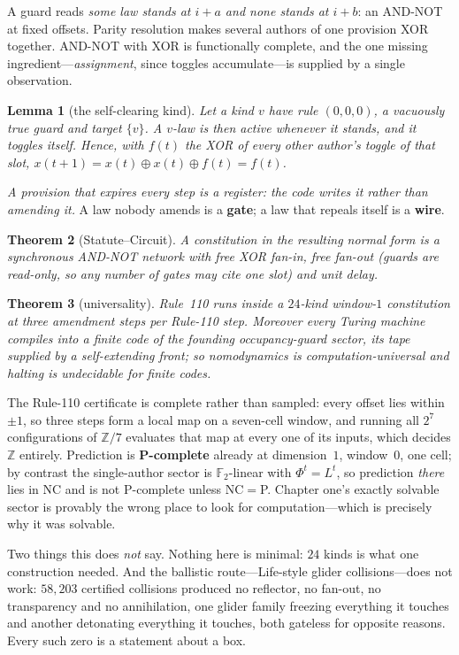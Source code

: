 \documentclass[10pt]{article}
\newtheorem{theorem}{Theorem}
\newtheorem{lemma}[theorem]{Lemma}
\theoremstyle{definition}
\theoremstyle{remark}
\begin{document}
A guard reads \emph{some law stands at $i+a$ and none stands at $i+b$}: an
AND-NOT at fixed offsets. Parity resolution makes several authors of one
provision XOR together. AND-NOT with XOR is functionally complete, and the one
missing ingredient---\emph{assignment}, since toggles accumulate---is supplied
by a single observation.
\begin{lemma}[the self-clearing kind]
Let a kind $v$ have rule $(0,0,0)$, a vacuously true guard and target $\{v\}$.
A $v$-law is then active whenever it stands, and it toggles itself. Hence, with
$f(t)$ the XOR of every other author's toggle of that slot,
$x(t+1)=x(t)\oplus x(t)\oplus f(t)=f(t)$.
\end{lemma}
\noindent \emph{A provision that expires every step is a register: the code
writes it rather than amending it.} A law nobody amends is a \textbf{gate}; a
law that repeals itself is a \textbf{wire}.
\begin{theorem}[Statute--Circuit]
A constitution in the resulting normal form \emph{is} a synchronous AND-NOT
network with free XOR fan-in, free fan-out (guards are read-only, so any number
of gates may cite one slot) and unit delay.
\end{theorem}
\begin{theorem}[universality]
Rule~110 runs inside a $24$-kind window-$1$ constitution at three amendment
steps per Rule-110 step. Moreover every Turing machine compiles into a
\emph{finite code} of the founding occupancy-guard sector, its tape supplied by
a self-extending front; so nomodynamics is computation-universal and halting is
undecidable for finite codes.
\end{theorem}
The Rule-110 certificate is complete rather than sampled: every offset lies
within $\pm1$, so three steps form a local map on a seven-cell window, and
running all $2^7$ configurations of $\mathbb{Z}/7$ evaluates that map at every
one of its inputs, which decides $\mathbb{Z}$ entirely. Prediction is
\textbf{P-complete} already at dimension~$1$, window~$0$, one cell; by contrast
the single-author sector is $\mathbb{F}_2$-linear with $\Phi^t=L^t$, so
prediction \emph{there} lies in NC and is not P-complete unless NC${}={}$P.
Chapter one's exactly solvable sector is provably the wrong place to look for
computation---which is precisely why it was solvable.

Two things this does \emph{not} say. Nothing here is minimal: $24$ kinds is
what one construction needed. And the ballistic route---Life-style glider
collisions---does not work: $58{,}203$ certified collisions produced no
reflector, no fan-out, no transparency and no annihilation, one glider family
freezing everything it touches and another detonating everything it touches,
both gateless for opposite reasons. Every such zero is a statement about a box.
\end{document}
